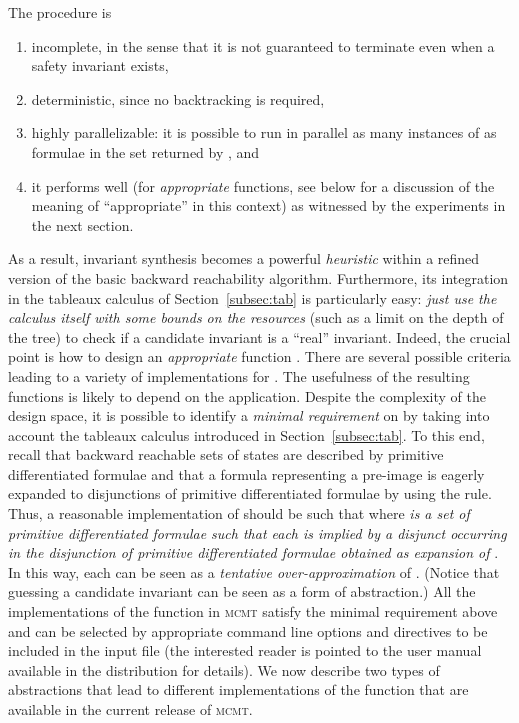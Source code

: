 \documentclass{LMCS}
\theoremstyle{plain}\newtheorem{assumption}[thm]{Assumption}
\theoremstyle{plain}\newtheorem{proposition}[thm]{Proposition}
\theoremstyle{plain}\newtheorem{property}[thm]{Property}
\theoremstyle{plain}\newtheorem{example}[thm]{Example}
\theoremstyle{plain}\newtheorem{claim}[thm]{Claim}
\theoremstyle{plain}\newtheorem{lemma}[thm]{Lemma}
\begin{document}
The procedure  is
\begin{enumerate}[]
\item incomplete, in the sense that it is not guaranteed to terminate
  even when a safety invariant exists,
\item deterministic, since no backtracking is required,
\item highly parallelizable: it is possible to run in parallel as many
  instances of  as formulae in the set returned by
  , and
\item it performs well (for \emph{appropriate} 
  functions, see below for a discussion of the meaning of
  ``appropriate'' in this context) as witnessed by the experiments in
  the next section.
\end{enumerate}
As a result, invariant synthesis becomes a powerful \emph{heuristic}
within a refined version of the basic backward reachability algorithm.
Furthermore, its integration in the tableaux calculus of
Section~\ref{subsec:tab} is particularly easy: \emph{just use the
  calculus itself with some bounds on the resources} (such as a limit
on the depth of the tree) to check if a candidate invariant is a
``real'' invariant.  Indeed, the crucial point is how to design an
\emph{appropriate} function .  There are several
possible criteria leading to a variety of implementations for
.  The usefulness of the resulting functions is
likely to depend on the application.  Despite the complexity of the
design space, it is possible to identify a \emph{minimal requirement}
on  by taking into account the tableaux calculus
introduced in Section~\ref{subsec:tab}. To this end, recall that
backward reachable sets of states are described by primitive
differentiated formulae and that a formula  representing a
pre-image is eagerly expanded to disjunctions of primitive
differentiated formulae by using the  rule.  Thus, a
reasonable implementation of  should be such that
 where \emph{ is a set of primitive
  differentiated formulae such that each  is implied by a
  disjunct  occurring in the disjunction of primitive
  differentiated formulae obtained as expansion of }.  In this way,
each  can be seen as a \emph{tentative over-approximation} of
.  (Notice that guessing a candidate invariant can be seen as a
form of abstraction.)  All the implementations of the function
 in \textsc{mcmt} satisfy the minimal requirement
above and can be selected by appropriate command line options and
directives to be included in the input file (the interested reader is
pointed to the user manual available in the distribution for details).
We now describe two types of abstractions that lead to different
implementations of the function  that are available
in the current release of \textsc{mcmt}.
\end{document}
